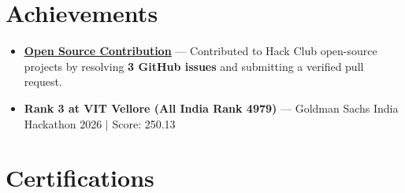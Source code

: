 \documentclass[a4paper,10pt]{article}
\newcommand{\ulink}[2]{\href{#1}{\uline{#2}}}
\begin{document}
\vspace{2pt}

\section{Achievements}
\vspace{2pt}
\begin{itemize}[nosep, leftmargin=1.5em, itemsep=1pt, topsep=2pt]
  \item {\color[HTML]{0A0A0A}\fontsize{11}{14}\selectfont \ulink{https://github.com/hackclub/stardance/graphs/contributors?all=1}{\textbf{Open Source Contribution}} --- Contributed to Hack Club open-source projects by resolving \textbf{3 GitHub issues} and submitting a verified pull request.}
  \item {\color[HTML]{0A0A0A}\fontsize{11}{14}\selectfont \textbf{Rank 3 at VIT Vellore (All India Rank 4979)} --- Goldman Sachs India Hackathon 2026 $|$ Score: 250.13}
\end{itemize}

\vspace{2pt}

\section{Certifications}
\vspace{2pt}
\end{document}
